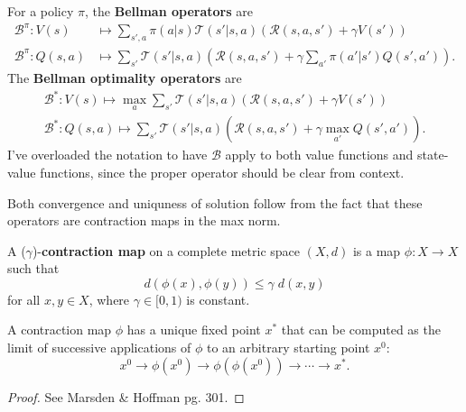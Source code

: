 \documentclass[twoside,10pt]{report}
\begin{document}
\begin{defn}
	For a policy $\pi$, the \textbf{Bellman operators} are
	\begin{align*}
		\mathcal{B}^{\pi}: V(s) &\mapsto \sum_{s',a} \pi(a|s) \mathcal{T}(s'|s,a) \left( \mathcal{R}(s,a,s') + \gamma V(s') \right) \\
		\mathcal{B}^{\pi}: Q(s,a) &\mapsto \sum_{s'} \mathcal{T}(s'|s,a) \left( \mathcal{R}(s,a,s') + \gamma \sum_{a'} \pi(a'|s') Q(s',a') \right).
	\end{align*}
	The \textbf{Bellman optimality operators} are
	\begin{align*}
		\mathcal{B}^{*}: V(s) \mapsto \max_{a} \sum_{s'} \mathcal{T}(s'|s,a) \left( \mathcal{R}(s,a,s') + \gamma V(s') \right) \\
		\mathcal{B}^{*}: Q(s,a) \mapsto \sum_{s'} \mathcal{T}(s'|s,a) \left( \mathcal{R}(s,a,s') + \gamma \max_{a'}Q(s',a') \right).
	\end{align*}
	I've overloaded the notation to have $\mathcal{B}$ apply to both value functions and state-value functions, since the proper operator should be clear from context.
\end{defn}

Both convergence and uniquness of solution follow from the fact that these operators are contraction maps in the max norm.

\begin{defn}[]
A ($\gamma$)-\textbf{contraction map} on a complete metric space $(X,d)$ is a map $\phi:X\to X$ such that
\[
d(\phi(x), \phi(y)) \leq \gamma \; d(x,y)
\] for all $x,y \in X$, where $\gamma \in [0, 1)$ is constant.
\end{defn}

\begin{thrm}
	A contraction map $\phi$ has a unique fixed point $x^{*}$ that can be computed as the limit of successive applications of $\phi$ to an arbitrary starting point $x^{0}$:
	\[
	x^{0} \to \phi(x^{0}) \to \phi(\phi(x^{0})) \to \cdots \to x^{*}.
	\] 
\end{thrm}
\begin{proof}
	See Marsden \& Hoffman pg. 301.
\end{proof}
\end{document}
